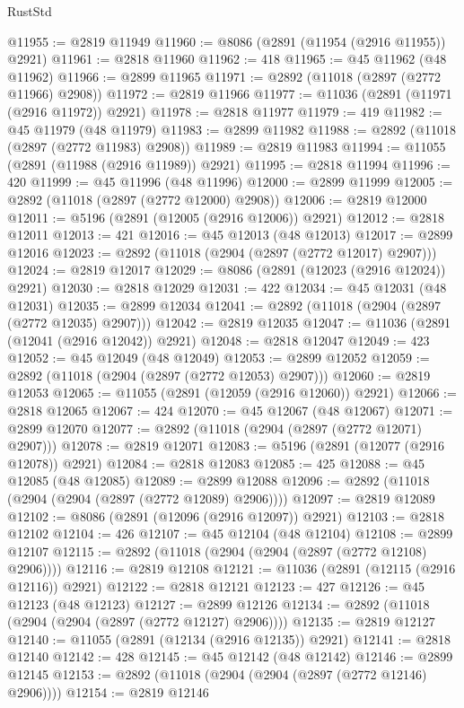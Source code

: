 \begin{lexlean}{RustStd}
\begin{coremodule}
@11955 := @2819 @11949
@11960 := @8086 (@2891 (@11954 (@2916 @11955)) @2921)
@11961 := @2818 @11960
@11962 := 418
@11965 := @45 @11962 (@48 @11962)
@11966 := @2899 @11965
@11971 := @2892 (@11018 (@2897 (@2772 @11966) @2908))
@11972 := @2819 @11966
@11977 := @11036 (@2891 (@11971 (@2916 @11972)) @2921)
@11978 := @2818 @11977
@11979 := 419
@11982 := @45 @11979 (@48 @11979)
@11983 := @2899 @11982
@11988 := @2892 (@11018 (@2897 (@2772 @11983) @2908))
@11989 := @2819 @11983
@11994 := @11055 (@2891 (@11988 (@2916 @11989)) @2921)
@11995 := @2818 @11994
@11996 := 420
@11999 := @45 @11996 (@48 @11996)
@12000 := @2899 @11999
@12005 := @2892 (@11018 (@2897 (@2772 @12000) @2908))
@12006 := @2819 @12000
@12011 := @5196 (@2891 (@12005 (@2916 @12006)) @2921)
@12012 := @2818 @12011
@12013 := 421
@12016 := @45 @12013 (@48 @12013)
@12017 := @2899 @12016
@12023 := @2892 (@11018 (@2904 (@2897 (@2772 @12017) @2907)))
@12024 := @2819 @12017
@12029 := @8086 (@2891 (@12023 (@2916 @12024)) @2921)
@12030 := @2818 @12029
@12031 := 422
@12034 := @45 @12031 (@48 @12031)
@12035 := @2899 @12034
@12041 := @2892 (@11018 (@2904 (@2897 (@2772 @12035) @2907)))
@12042 := @2819 @12035
@12047 := @11036 (@2891 (@12041 (@2916 @12042)) @2921)
@12048 := @2818 @12047
@12049 := 423
@12052 := @45 @12049 (@48 @12049)
@12053 := @2899 @12052
@12059 := @2892 (@11018 (@2904 (@2897 (@2772 @12053) @2907)))
@12060 := @2819 @12053
@12065 := @11055 (@2891 (@12059 (@2916 @12060)) @2921)
@12066 := @2818 @12065
@12067 := 424
@12070 := @45 @12067 (@48 @12067)
@12071 := @2899 @12070
@12077 := @2892 (@11018 (@2904 (@2897 (@2772 @12071) @2907)))
@12078 := @2819 @12071
@12083 := @5196 (@2891 (@12077 (@2916 @12078)) @2921)
@12084 := @2818 @12083
@12085 := 425
@12088 := @45 @12085 (@48 @12085)
@12089 := @2899 @12088
@12096 := @2892 (@11018 (@2904 (@2904 (@2897 (@2772 @12089) @2906))))
@12097 := @2819 @12089
@12102 := @8086 (@2891 (@12096 (@2916 @12097)) @2921)
@12103 := @2818 @12102
@12104 := 426
@12107 := @45 @12104 (@48 @12104)
@12108 := @2899 @12107
@12115 := @2892 (@11018 (@2904 (@2904 (@2897 (@2772 @12108) @2906))))
@12116 := @2819 @12108
@12121 := @11036 (@2891 (@12115 (@2916 @12116)) @2921)
@12122 := @2818 @12121
@12123 := 427
@12126 := @45 @12123 (@48 @12123)
@12127 := @2899 @12126
@12134 := @2892 (@11018 (@2904 (@2904 (@2897 (@2772 @12127) @2906))))
@12135 := @2819 @12127
@12140 := @11055 (@2891 (@12134 (@2916 @12135)) @2921)
@12141 := @2818 @12140
@12142 := 428
@12145 := @45 @12142 (@48 @12142)
@12146 := @2899 @12145
@12153 := @2892 (@11018 (@2904 (@2904 (@2897 (@2772 @12146) @2906))))
@12154 := @2819 @12146

\end{coremodule}
\end{lexlean}
